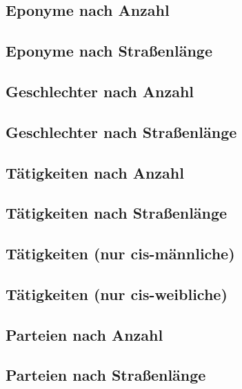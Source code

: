 \documentclass[ngerman,twocolumn,showpacs,%
  nofootinbib,aps,superscriptaddress,%
  eqsecnum,prd,notitlepage,showkeys,10pt,report]{revtex4-2}
\begin{document}
\subsection{Eponyme nach Anzahl}
\subsection{Eponyme nach Straßenlänge}
\subsection{Geschlechter nach Anzahl}
\subsection{Geschlechter nach Straßenlänge}
\subsection{Tätigkeiten nach Anzahl}
\subsection{Tätigkeiten nach Straßenlänge}
\subsection{Tätigkeiten (nur cis-männliche)}
\subsection{Tätigkeiten (nur cis-weibliche)}
\subsection{Parteien nach Anzahl}
\subsection{Parteien nach Straßenlänge}
\end{document}
